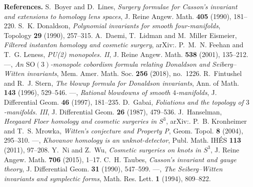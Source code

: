 \documentclass[10pt]{amsart}
\makeatletter
\numberwithin{equation}{section}
\theoremstyle{compact}
\renewenvironment{thebibliography}[1]{\par\footnotesize\noindent
  \textbf{References.}\ignorespaces
  \def\@lbibitem[##1]##2{\unskip\hskip.5em plus.3em minus.1em[##1]~\if@filesw\immediate
    \write\@auxout{\string\bibcite{##2}{##1}}\fi\ignorespaces}%
  \def\bysame{---}}{\par}
\makeatother
\begin{document}
\begin{thebibliography}{DLME}
 S.~Boyer and D.~Lines, \emph{Surgery formulae for Casson's
invariant and extensions to homology lens spaces}, J. Reine Angew. Math.
\textbf{405} (1990), 181--220.
 S.~K. Donaldson, \emph{Polynomial invariants for smooth
four-manifolds}, Topology \textbf{29} (1990), 257--315.
 A.~Daemi, T.~Lidman and M.~Miller Eismeier,
\emph{Filtered instanton homology and cosmetic surgery},
arXiv:.
 P.~M.~N. Feehan and T.~G. Leness, \emph{PU(2) monopoles.
II}, J. Reine Angew. Math. \textbf{538} (2001), 135--212.
 \bysame, \emph{An $\mathrm{SO}(3)$-monopole cobordism
formula relating Donaldson and Seiberg--Witten invariants}, Mem. Amer. Math.
Soc. \textbf{256} (2018), no.~1226.
 R.~Fintushel and R.~J. Stern, \emph{The blowup formula for
Donaldson invariants}, Ann. of Math. \textbf{143} (1996), 529--546.
 \bysame, \emph{Rational blowdowns of smooth $4$-manifolds},
J. Differential Geom. \textbf{46} (1997), 181--235.
 D.~Gabai, \emph{Foliations and the topology of $3$-manifolds.
III}, J. Differential Geom. \textbf{26} (1987), 479--536.
 J.~Hanselman, \emph{Heegaard Floer homology and cosmetic
surgeries in $S^3$}, arXiv:.
 P.~B. Kronheimer and T.~S. Mrowka, \emph{Witten's
conjecture and Property P}, Geom. Topol. \textbf{8} (2004), 295--310.
 \bysame, \emph{Khovanov homology is an unknot-detector},
Publ. Math. IH\'ES \textbf{113} (2011), 97--208.
 Y.~Ni and Z.~Wu, \emph{Cosmetic surgeries on knots in $S^3$},
J. Reine Angew. Math. \textbf{706} (2015), 1--17.
 C.~H. Taubes, \emph{Casson's invariant and gauge theory}, J.
Differential Geom. \textbf{31} (1990), 547--599.
 \bysame, \emph{The Seiberg--Witten invariants and symplectic
forms}, Math. Res. Lett. \textbf{1} (1994), 809--822.
\end{thebibliography}
\end{document}
